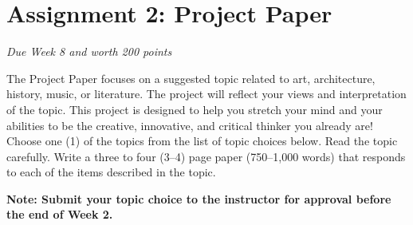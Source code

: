 \pagebreak
\section*{Assignment 2: Project Paper}
\emph{Due Week 8 and worth 200 points}

The Project Paper focuses on a suggested topic related to art, architecture, history, music, or literature. The project will reflect your views and interpretation of the topic. This project is designed to help you stretch your mind and your abilities to be the creative, innovative, and critical thinker you already are! Choose one (1) of the topics from the list of topic choices below. Read the topic carefully. Write a three to four (3--4) page paper (750--1,000 words) that responds to each of the items described in the topic.

\textbf{Note: Submit your topic choice to the instructor for approval before the end of Week 2.}


